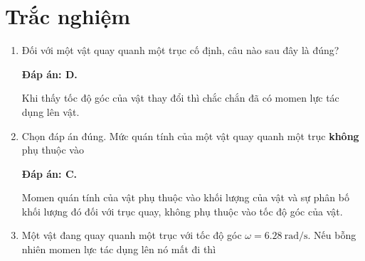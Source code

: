 \whiteBGstarBegin
\setcounter{section}{0}
\section{Trắc nghiệm}
\begin{enumerate}[label=\bfseries Câu \arabic*:]
	
	\item {}
	
	\cauhoi
	{Đối với một vật quay quanh một trục cố định, câu nào sau đây là đúng?
	}
	
	\loigiai
	{	\textbf{Đáp án: D.}
		
	Khi thấy tốc độ góc của vật thay đổi thì chắc chắn đã có momen lực tác dụng lên vật.	
	}
	\item {}
	
	\cauhoi
	{Chọn đáp án đúng. Mức quán tính của một vật quay quanh một trục \textbf{không} phụ thuộc vào
	}
	
	\loigiai
	{	\textbf{Đáp án: C.}
		
		Momen quán tính của vật phụ thuộc vào khối lượng của vật và sự phân bố khối lượng đó đối với trục quay, không phụ thuộc vào tốc độ góc của vật.
	}
	
	\item {}
	
	\cauhoi
	{Một vật đang quay quanh một trục với tốc độ góc $\omega =\SI{6.28}{\radian/\second}$. Nếu bỗng nhiên momen lực tác dụng lên nó mất đi thì 
	}
	

\end{enumerate}
